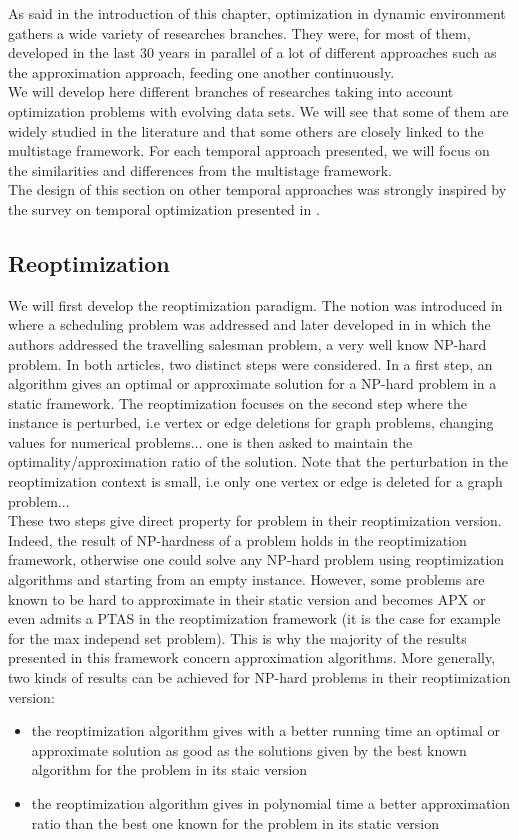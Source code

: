\documentclass[a4paper]{book}
\begin{document}
As said in the introduction of this chapter, optimization in dynamic environment gathers a wide variety of researches branches. They were, for most of them, developed in the last 30 years in parallel of a lot of different approaches such as the approximation approach, feeding one another continuously.\\
We will develop here different branches of researches taking into account optimization problems with evolving data sets. We will see that some of them are widely studied in the literature and that some others are closely linked to the multistage framework. For each temporal approach presented, we will focus on the similarities and differences from the multistage framework. \\

The design of this section on other temporal approaches was strongly inspired by the survey on temporal optimization presented in \cite{boria2011survey}. 

\subsection{Reoptimization}
We will first develop the reoptimization paradigm.  The notion was introduced in \cite{Schaffter97} where a scheduling problem was addressed and later developed in \cite{archetti2003reoptimizing} in which the authors addressed the {\sc travelling salesman} problem, a very well know NP-hard problem. In both articles, two distinct steps were considered. In a first step, an algorithm gives an optimal or approximate solution for a NP-hard problem in a static framework. The reoptimization focuses on the second step where the instance is perturbed, i.e vertex or edge deletions for graph problems, changing values for numerical problems$\ldots$ one is then asked to maintain the optimality/approximation ratio of the solution. Note that the perturbation in the reoptimization context is small, i.e only one vertex or edge is deleted for a graph problem$\ldots$ \\
These two steps give direct property for problem in their reoptimization version. Indeed, the result of NP-hardness of a problem holds in the reoptimization framework, otherwise one could solve any NP-hard problem using reoptimization algorithms and starting from an empty instance. However, some problems are known to be hard to approximate in their static version and becomes APX or even admits a PTAS in the reoptimization framework (it is the case for example for the {\sc max independ set} problem). This is why the majority of the results presented in this framework concern approximation algorithms. More generally, two kinds of results can be achieved for NP-hard problems in their reoptimization version:
\begin{itemize}
    \item the reoptimization algorithm gives with a better running time an optimal or approximate solution as good as the solutions given by the best known algorithm for the problem in its staic version 
    \item the reoptimization algorithm gives in polynomial time a better approximation ratio than the best one known for the problem in its static version
\end{itemize}
\end{document}
